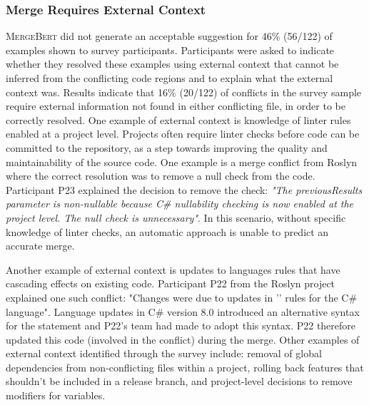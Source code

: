 \subsubsection{Merge Requires External Context}
 \textsc{MergeBert} did not generate an acceptable suggestion for 46\% (56/122) of examples shown to survey participants. Participants were asked to indicate whether they resolved these examples using external context that cannot be inferred from the conflicting code regions and to explain what the external context was.  
Results indicate that 16\% (20/122) of conflicts in the survey sample require external information not found in either conflicting file, in order to be correctly resolved. 
One example of external context is knowledge of linter rules enabled at a project level. Projects often require linter checks before code can be committed to the repository, as a step towards improving the quality and maintainability of the source code. One example is a merge conflict from Roslyn where the correct resolution was to remove a null check from the code. Participant P23 explained the decision to remove the check: \emph{"The previousResults parameter is non-nullable because C\# nullability checking is now enabled at the project level. The null check is unnecessary"}. In this scenario, without specific knowledge of linter checks, an automatic approach is unable to predict an accurate merge. 
 
 Another example of external context is updates to languages rules that have cascading effects on existing code. Participant P22 from the Roslyn project explained one such conflict:  "Changes were due to updates in '' rules for the C\# language".  Language updates in C\# version 8.0 introduced an alternative syntax for the  statement and P22's team had made to adopt this syntax.  P22 therefore updated this code (involved in the conflict) during the merge. Other examples of external context identified through the survey include: removal of global dependencies from non-conflicting files within a project, rolling back features that shouldn't be included in a release branch, and project-level decisions to remove  modifiers for variables. 


